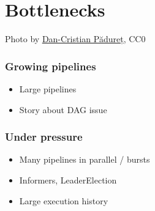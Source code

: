 \documentclass[aspectratio=169,11pt,hyperref={colorlinks=true}]{beamer}
\begin{document}
\section[Bottlenecks]{Bottlenecks}
\begin{sectionwithpicrx}{Photo by \href{https://unsplash.com/@dancristianp}{\underline{Dan-Cristian Pădureț}}, CC0}
\end{sectionwithpicrx}

\begin{grayframe}
  \frametitle{Growing pipelines}
  \begin{itemize}
    \item Large pipelines
    \item Story about DAG issue
  \end{itemize}
\end{grayframe}

\begin{grayframe}
  \frametitle{Under pressure}
  \begin{itemize}
    \item Many pipelines in parallel / bursts
    \item Informers, LeaderElection
    \item Large execution history
  \end{itemize}
\end{grayframe}
\end{document}
